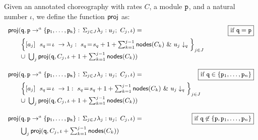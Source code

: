 \begin{definition}\label{def:projCTMC} Given an
  annotated choreography with rates $C$, a module $\mathtt{p}$, and a
  natural number $\iota$, we define the function $\mathsf{proj}$ as:
  \begin{displaymath}\small
        \begin{array}{lr}

          \proj (\role q,\interactl{p}{a}{\role p_1,\ldots,\role p_n}, \iota)= 
          &  \boxed{\text{if }\role q=\role p}\\[2mm]
          \qquad
          \Big\{\commandBase {a_j} {\ s_{q}\!=\! \iota} {\lambda_j:\ s_{q}\!=\!
          s_{q} +1+\sum_{k=1}^{j-1}\mathsf{nodes}({C_k})}\ \&\ \projE
          {u_j}q\Big\}_{j\in J}
          \\
          \qquad\cup\ \bigcup_{j} \proj (\role q, C_j, \iota+1+\sum_{k=1}^{j-1}\mathsf{nodes}({C_k}))
          \\\\

          \proj (\role q,\interactl{p}{a}{\role p_1,\ldots,\role p_n}, \iota)= 
          &  \!\!\!\!\!\! \!\!\!\!\!\!\boxed{\text{if }\role q\in\{\role p_1,\ldots,\role p_n\}}\\[2mm]
          \qquad
          \Big\{\commandBase {a_j} {\ s_{q}\!=\! \iota} {1:\ s_{q}\!=\!
          s_{q} +1+\sum_{k=1}^{j-1}\mathsf{nodes}({C_k})}\ \&\ \projE
          {u_j}q\Big\}_{j\in J}
          \\
          \qquad\cup\ \bigcup_{j} \proj (\role q, C_j, \iota+1+\sum_{k=1}^{j-1}\mathsf{nodes}({C_k}))
          \\\\

          \proj (\role q,\interactl{p}a{\role p_1,\ldots,\role p_n}, \iota)=
          &  \hspace{-1.8cm}\boxed{\text{if }\role q\not\in\{\role p, 
            \role p_1,\ldots,\role p_n\}}
          \\[2mm]

          \qquad\bigcup_{j} \proj (\role q, C_j, \iota+\sum_{k=1}^{j-1}\mathsf{nodes}({C_k}))



\end{array}
\end{displaymath}
\end{definition}
